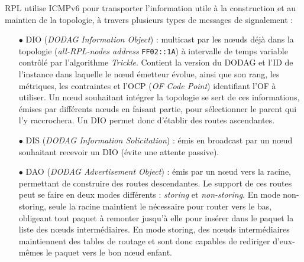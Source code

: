 \documentclass[]{report}
\begin{document}
\par RPL utilise ICMPv6 pour transporter l'information utile à la construction et au maintien de la topologie, à travers plusieurs types de messages de signalement : 
\vspace{0.2cm}
\begin{itemize}
\item[$\bullet$] DIO (\textit{DODAG Information Object}) : multicast par les nœuds déjà dans la topologie (\textit{all-RPL-nodes address} \texttt{FF02::1A}) à intervalle de temps variable contrôlé par l'algorithme \textit{Trickle}. Contient la version du DODAG et l'ID de l'instance dans laquelle le nœud émetteur évolue, ainsi que son rang, les métriques, les contraintes et l'OCP (\textit{OF Code Point}) identifiant l'OF à utiliser. Un nœud souhaitant intégrer la topologie se sert de ces informations, émises par différents nœuds en faisant partie, pour sélectionner le parent qui l'y raccrochera. Un DIO permet donc d'établir des routes ascendantes.
\vspace{0.2cm}
\item[$\bullet$] DIS (\textit{DODAG Information Solicitation}) : émis en broadcast par un nœud souhaitant recevoir un DIO (évite une attente passive).
\vspace{0.2cm}
\item[$\bullet$] DAO (\textit{DODAG Advertisement Object}) : émis par un nœud vers la racine, permettant de construire des routes descendantes. Le support de ces routes peut se faire en deux modes différents : \textit{storing} et \textit{non-storing}. En mode non-storing, seule la racine maintient le nécessaire pour router vers le bas, obligeant tout paquet à remonter jusqu'à elle pour insérer dans le paquet la liste des nœuds intermédiaires. En mode storing, des nœuds intermédiaires maintiennent des tables de routage et sont donc capables de rediriger d'eux-mêmes le paquet vers le bon nœud enfant. 
\end{itemize}
 
\vspace{0.5cm}
\end{document}
